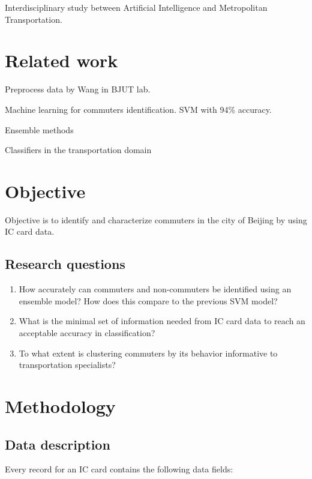 \documentclass{article}
\begin{document}
Interdisciplinary study between Artificial Intelligence and Metropolitan Transportation.


\section{Related work}
Preprocess data by Wang in BJUT lab.

Machine learning for commuters identification. SVM with 94\% accuracy.

Ensemble methods

Classifiers in the transportation domain

\section{Objective}
Objective is to identify and characterize commuters in the city of Beijing by using IC card data.

\subsection{Research questions}
\begin{enumerate}
\item How accurately can commuters and non-commuters be identified using an ensemble model? How does this compare to the previous SVM model?
\item What is the minimal set of information needed from IC card data to reach an acceptable accuracy in classification?
\item To what extent is clustering commuters by its behavior informative to transportation specialists? 
\end{enumerate}

\section{Methodology}
\subsection{Data description}
Every record for an IC card contains the following data fields:
\end{document}
